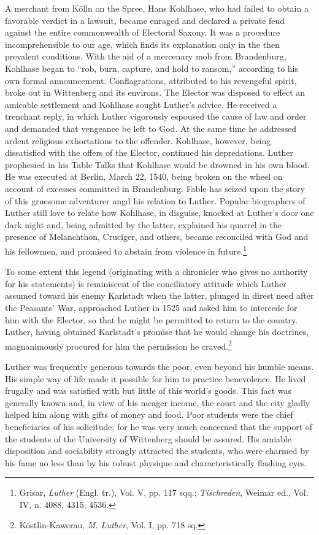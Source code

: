 A merchant from Kölln on the Spree, Hans Kohlhase, who had
failed to obtain a favorable verdict in a lawsuit, became enraged and
declared a private feud against the entire commonwealth of Electoral
Saxony. It was a procedure incomprehensible to our age, which finds
its explanation only in the then prevalent conditions. With the aid
of a mercenary mob from Brandenburg, Kohlhase began to “rob,
burn, capture, and hold to ransom,” according to his own formal
announcement. Conflagrations, attributed to his revengeful spirit,
broke out in Wittenberg and its environs. The Elector was disposed
to effect an amicable settlement and Kohlhase sought Luther’s advice.
He received a trenchant reply, in which Luther vigorously espoused
the cause of law and order and demanded that vengeance be left to
God. At the same time he addressed ardent religious exhortations to
the offender. Kohlhase, however, being dissatisfied with the offers of
the Elector, continued his depredations. Luther prophesied in his Table
Talks that Kohlhase would be drowned in his own blood. He was
executed at Berlin, March 22, 1540, being broken on the wheel on
account of excesses committed in Brandenburg. Fable has seized upon
the story of this gruesome adventurer angd his relation to Luther.
Popular biographers of Luther still love to relate how Kohlhase, in
disguise, knocked at Luther’s door one dark night and, being admitted
by the latter, explained his quarrel in the presence of Melanchthon, Cruciger,
and others, became reconciled with God and his fellowmen, and promised
to abstain from violence in future.\footnote
{Grisar, \textit{Luther} (Engl. tr.), Vol. V, pp. 117 sqq.; \textit{Tischreden}, Weimar ed., Vol. IV,
n. 4088, 4315, 4536.}

To some extent this legend (originating with a chronicler who
gives no authority for his statements) is reminiscent of the conciliatory
attitude which Luther assumed toward his enemy Karlstadt when the latter,
plunged in direst need after the Peasants’ War,
approached Luther in 1525 and asked him to intercede for him with
the Elector, so that he might be permitted to return to the country.
Luther, having obtained Karlstadt’s promise that he would change
his doctrines, magnanimously procured for him the permission he
craved.\footnote{Köstlin-Kawerau, \textit{M. Luther}, Vol. I, pp. 718 sq.}


Luther was frequently generous towards the poor, even beyond
his humble means. His simple way of life made it possible for him to
practice benevolence. He lived frugally and was satisfied with but
little of this world’s goods. This fact was generally known and, in
view of his meager income, the court and the city gladly helped him
along with gifts of money and food. Poor students were the chief
beneficiaries of his solicitude; for he was very much concerned that
the support of the students of the University of Wittenberg should
be assured. His amiable disposition and sociability strongly attracted
the students, who were charmed by his fame no less than by his robust
physique and characteristically flashing eyes.

